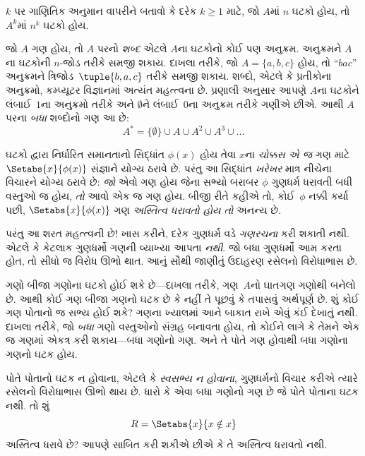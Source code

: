 \begin{prob}
$k$ પર ગાણિતિક અનુમાન વાપરીને બતાવો કે દરેક $k \ge 1$ માટે,
જો $A$માં $n$ ઘટકો હોય, તો $A^k$માં $n^k$ ઘટકો હોય.
\end{prob}

\begin{ex}
જો $A$ ગણ હોય, તો $A$ પરનો \emph{શબ્દ} એટલે $A$ના ઘટકોનો
કોઈ પણ અનુક્રમ. અનુક્રમને $A$ના ઘટકોની $n$-જોડ તરીકે સમજી શકાય.
દાખલા તરીકે, જો $A = \{a, b, c\}$ હોય, તો “$bac$” અનુક્રમને
ત્રિજોડ~$\tuple{b, a, c}$ તરીકે સમજી શકાય.
શબ્દો, એટલે કે પ્રતીકોના અનુક્રમો, કમ્પ્યૂટર વિજ્ઞાનમાં અત્યંત મહત્ત્વના છે.
પ્રણાલી અનુસાર આપણે $A$ના ઘટકોને લંબાઈ~$1$ના અનુક્રમો તરીકે
અને $\emptyset$ને લંબાઈ~$0$ના અનુક્રમ તરીકે ગણીએ છીએ.
આથી $A$ પરના \emph{બધા} શબ્દોનો ગણ આ છે:
\[
A^* = \{\emptyset\} \cup A \cup A^2 \cup A^3 \cup \dots
\]
\end{ex}
\endgroup


\begingroup
\makeatletter{}\makeatother

\label{guunit:OLP-0010}


ઘટકો દ્વારા નિર્ધારિત સમાનતાનો સિદ્ધાંત $\phi(x)$ હોય તેવા $x$ના
\emph{ચોક્કસ એ જ} ગણ માટે $\Setabs{x}{\phi(x)}$ સંજ્ઞાને યોગ્ય ઠરાવે છે.
પરંતુ આ સિદ્ધાંત \emph{ખરેખર} માત્ર નીચેના વિચારને યોગ્ય ઠરાવે છે:
\emph{જો} એવો ગણ હોય જેના સભ્યો બરાબર $\phi$ ગુણધર્મ ધરાવતી બધી
વસ્તુઓ જ હોય, \emph{તો} આવો એક જ ગણ હોય.
બીજી રીતે કહીએ તો, કોઈ~$\phi$ નક્કી કર્યા પછી,
$\Setabs{x}{\phi(x)}$ ગણ \emph{અસ્તિત્વ ધરાવતો હોય તો} અનન્ય છે.

પરંતુ આ શરત મહત્ત્વની છે!{} ખાસ કરીને, દરેક ગુણધર્મ વડે
\emph{ગણરચના} કરી શકાતી નથી. એટલે કે કેટલાક ગુણધર્મો ગણની વ્યાખ્યા
આપતા \emph{નથી}. જો બધા ગુણધર્મો આમ કરતા હોત, તો સીધો જ
વિરોધ ઊભો થાત. આનું સૌથી જાણીતું ઉદાહરણ રસેલનો વિરોધાભાસ છે.

ગણો બીજા ગણોના ઘટકો હોઈ શકે છે---દાખલા તરીકે,
ગણ~$A$નો ઘાતગણ ગણોથી બનેલો છે.
આથી કોઈ ગણ બીજા ગણનો ઘટક છે કે નહીં તે પૂછવું કે તપાસવું અર્થપૂર્ણ છે.
શું કોઈ ગણ પોતાનો જ સભ્ય હોઈ શકે?
ગણના ખ્યાલમાં આને બાકાત રાખે એવું કંઈ દેખાતું નથી.
દાખલા તરીકે, જો \emph{બધા} ગણો વસ્તુઓનો સંગ્રહ બનાવતા હોય,
તો કોઈને લાગે કે તેમને એક જ ગણમાં એકત્ર કરી શકાય---બધા ગણોનો ગણ.
અને તે પોતે ગણ હોવાથી બધા ગણોના ગણનો ઘટક હોય.

પોતે પોતાનો ઘટક ન હોવાના, એટલે કે \emph{સ્વસભ્ય ન હોવાના},
ગુણધર્મનો વિચાર કરીએ ત્યારે રસેલનો વિરોધાભાસ ઊભો થાય છે.
ધારો કે એવા બધા ગણોનો ગણ છે જે પોતે પોતાના ઘટક નથી.
તો શું
\[
R = \Setabs{x}{x \notin x}
\]
અસ્તિત્વ ધરાવે છે? આપણે સાબિત કરી શકીએ છીએ કે તે અસ્તિત્વ ધરાવતો નથી.

